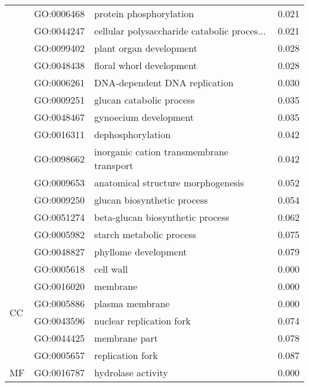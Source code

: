 \begin{longtable}{lllr}
   & GO:0006468 &                      protein phosphorylation &         0.021 \\
   & GO:0044247 &  cellular polysaccharide catabolic proces... &         0.021 \\
   & GO:0099402 &                      plant organ development &         0.028 \\
   & GO:0048438 &                     floral whorl development &         0.028 \\
   & GO:0006261 &                DNA-dependent DNA replication &         0.030 \\
   & GO:0009251 &                     glucan catabolic process &         0.035 \\
   & GO:0048467 &                        gynoecium development &         0.035 \\
   & GO:0016311 &                            dephosphorylation &         0.042 \\
   & GO:0098662 &     inorganic cation transmembrane transport &         0.042 \\
   & GO:0009653 &           anatomical structure morphogenesis &         0.052 \\
   & GO:0009250 &                  glucan biosynthetic process &         0.054 \\
   & GO:0051274 &             beta-glucan biosynthetic process &         0.062 \\
   & GO:0005982 &                     starch metabolic process &         0.075 \\
   & GO:0048827 &                         phyllome development &         0.079 \\
\cline{1-4}
\multirow{6}{*}{CC} & GO:0005618 &                                    cell wall &         0.000 \\
   & GO:0016020 &                                     membrane &         0.000 \\
   & GO:0005886 &                              plasma membrane &         0.000 \\
   & GO:0043596 &                     nuclear replication fork &         0.074 \\
   & GO:0044425 &                                membrane part &         0.078 \\
   & GO:0005657 &                             replication fork &         0.087 \\
\cline{1-4}
\multirow{36}{*}{MF} & GO:0016787 &                           hydrolase activity &         0.000 \\

\end{longtable}
